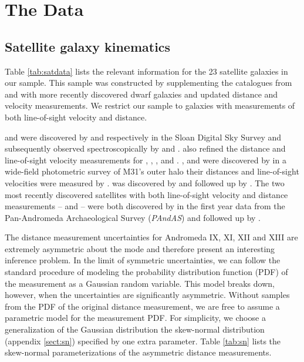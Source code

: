 \documentclass[preprint]{aastex}
\newcommand{\project}[1]{\emph{#1}}
\newcommand{\sdss}{\project{SDSS}}
\newcommand{\pandas}{\project{PAndAS}}
\begin{document}
\section{The Data}

\subsection{Satellite galaxy kinematics}

Table \ref{tab:satdata} lists the relevant information for the 23 satellite
galaxies in our sample.  This sample was constructed by supplementing the
catalogues from \citet{Evans:2000a} and \cite{McConnachie:2006} with more
recently discovered dwarf galaxies and updated distance and velocity measurements.
We restrict our sample to galaxies with measurements of both line-of-sight
velocity and distance.

 and  were discovered by
\citet{Zucker:2004} and \citet{Zucker:2007} respectively in the Sloan Digital
Sky Survey \citep[\sdss;][]{York:2000} and subsequently observed spectroscopically
by \citet{Collins:2010} and \citet{Kalirai:2010}.  \citet{Kalirai:2010} also
refined the distance and line-of-sight velocity measurements for
, , ,
 and .  ,
 and  were discovered by
\citet{Martin:2006} in a wide-field photometric survey of M31's outer halo
their distances and line-of-sight velocities were measured by
\citet{Collins:2010}.   was discovered by
\citet{Majewski:2007} and followed up by \citet{Kalirai:2010}.  The two most
recently discovered satellites with both line-of-sight velocity and distance
measurements --  and  -- were
both discovered by \citet{Ibata:2007} in the first year data from the
Pan-Andromeda Archaeological Survey (\pandas) and followed up by \citet{Letarte:2009}.

The distance measurement uncertainties for Andromeda IX, XI, XII and XIII are
extremely asymmetric about the mode and therefore present an interesting
inference problem.  In the limit of symmetric uncertainties, we can follow the
standard procedure of modeling the probability distribution function (PDF) of
the measurement as a Gaussian random variable.  This model breaks down, however,
when the uncertainties are significantly asymmetric.  Without samples from the PDF
of the original distance measurement, we are free to assume a parametric model
for the measurement PDF.  For simplicity, we choose a generalization of the
Gaussian distribution the skew-normal distribution (appendix \ref{sect:sn})
specified by one extra parameter.  Table \ref{tab:sn} lists the skew-normal
parameterizations of the asymmetric distance measurements.
\end{document}
